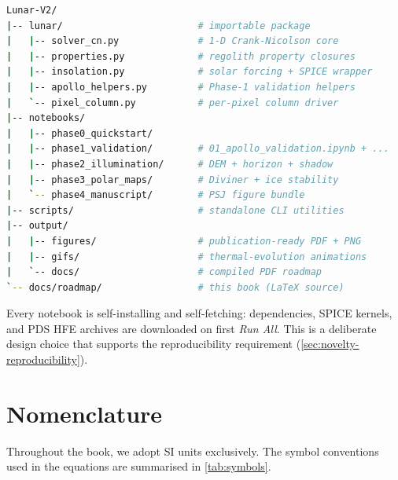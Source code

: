 \begin{lstlisting}[caption={Top-level directory layout (abridged).},label={lst:repo-layout},language=bash]
Lunar-V2/
|-- lunar/                        # importable package
|   |-- solver_cn.py              # 1-D Crank-Nicolson core
|   |-- properties.py             # regolith property closures
|   |-- insolation.py             # solar forcing + SPICE wrapper
|   |-- apollo_helpers.py         # Phase-1 validation helpers
|   `-- pixel_column.py           # per-pixel column driver
|-- notebooks/
|   |-- phase0_quickstart/
|   |-- phase1_validation/        # 01_apollo_validation.ipynb + ...
|   |-- phase2_illumination/      # DEM + horizon + shadow
|   |-- phase3_polar_maps/        # Diviner + ice stability
|   `-- phase4_manuscript/        # PSJ figure bundle
|-- scripts/                      # standalone CLI utilities
|-- output/
|   |-- figures/                  # publication-ready PDF + PNG
|   |-- gifs/                     # thermal-evolution animations
|   `-- docs/                     # compiled PDF roadmap
`-- docs/roadmap/                 # this book (LaTeX source)
\end{lstlisting}

Every notebook is self-installing and self-fetching: 
dependencies, SPICE kernels, and PDS HFE archives are downloaded on
first \emph{Run All}.  This is a deliberate design choice that
supports the reproducibility requirement (\cref{sec:novelty-reproducibility}).

\section{Nomenclature}

Throughout the book, we adopt SI units exclusively.  The symbol
conventions used in the equations are summarised in
\cref{tab:symbols}.

